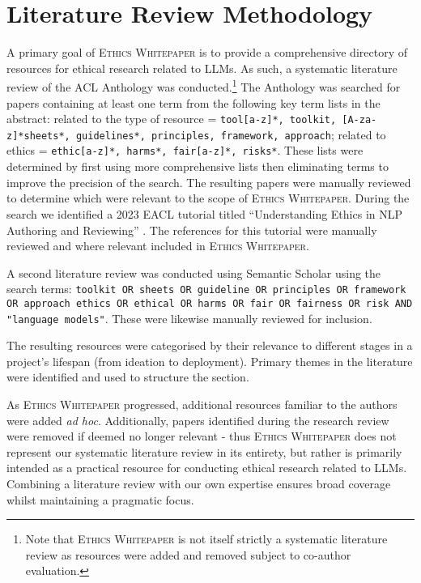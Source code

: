 \section{Literature Review Methodology}
A primary goal of \textsc{Ethics Whitepaper} is to provide a comprehensive directory of resources for ethical research related to LLMs. As such, a systematic literature review of the ACL Anthology was conducted.\footnote{Note that \textsc{Ethics Whitepaper} is not itself strictly a systematic literature review as resources were added and removed subject to co-author evaluation.} The Anthology was searched for papers containing at least one term from the following key term lists in the abstract: related to the type of resource = \texttt{tool[a-z]*, toolkit, [A-za-z]*sheets*, guidelines*, principles, framework, approach}; related to ethics = \texttt{ethic[a-z]*, harms*, fair[a-z]*, risks*}. These lists were determined by first using more comprehensive lists then eliminating terms to improve the precision of the search. %
The resulting papers were manually reviewed to determine which were relevant to the scope of \textsc{Ethics Whitepaper}. During the search we identified a 2023 EACL tutorial titled ``Understanding Ethics in NLP Authoring and Reviewing'' \citep{benotti_understanding_2023}. The references for this tutorial were manually reviewed and where relevant included in \textsc{Ethics Whitepaper}. 

A second literature review was conducted using Semantic Scholar using the search terms:  \texttt{toolkit OR sheets OR guideline OR principles OR framework OR approach ethics OR ethical OR harms OR fair OR fairness OR risk AND "language models"}. %
These were likewise manually reviewed for inclusion.

The resulting resources were categorised by their relevance to different stages in a project's lifespan (from ideation to deployment). Primary themes in the literature were identified and used to structure the section. 

As \textsc{Ethics Whitepaper} progressed, additional resources familiar to the authors were added \textit{ad hoc}. Additionally, papers identified during the research review were removed if deemed no longer relevant - thus \textsc{Ethics Whitepaper} does not represent our systematic literature review in its entirety, but rather is primarily intended as a practical resource for conducting ethical research related to LLMs. Combining a literature review with our own expertise ensures broad coverage whilst maintaining a pragmatic focus. 